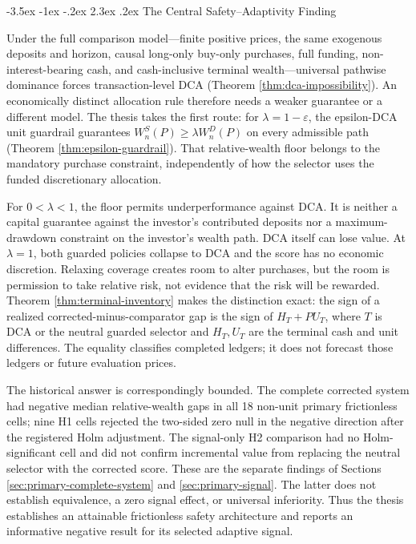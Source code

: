 \documentclass[12pt,a4paper,oneside]{report}
\makeatletter
\renewcommand\section{\@startsection{section}{1}{\z@}%
  {-3.5ex \@plus -1ex \@minus -.2ex}%
  {2.3ex \@plus .2ex}%
  {\normalfont\fontsize{14}{17}\selectfont\bfseries}}
\makeatother
\begin{document}
\section{The Central Safety--Adaptivity Finding}
\label{sec:central-finding}

Under the full comparison model---finite positive prices, the same exogenous
deposits and horizon, causal long-only buy-only purchases, full funding,
non-interest-bearing cash, and cash-inclusive terminal wealth---universal
pathwise dominance forces transaction-level DCA (Theorem
\ref{thm:dca-impossibility}). An economically distinct allocation rule therefore
needs a weaker guarantee or a different model. The thesis takes the first
route: for $\lambda=1-\varepsilon$, the epsilon-DCA unit guardrail guarantees
$W_n^S(P)\geq\lambda W_n^D(P)$ on every admissible path (Theorem
\ref{thm:epsilon-guardrail}). That relative-wealth floor belongs to the
mandatory purchase constraint, independently of how the selector uses the
funded discretionary allocation.

For $0<\lambda<1$, the floor permits underperformance against DCA. It is
neither a capital guarantee against the investor's contributed deposits nor a
maximum-drawdown constraint on the investor's wealth path. DCA itself can lose
value. At $\lambda=1$, both guarded policies collapse to DCA and the score has
no economic discretion. Relaxing coverage creates room to alter purchases,
but the room is permission to take relative risk, not evidence that the risk
will be rewarded. Theorem \ref{thm:terminal-inventory} makes the distinction
exact: the sign of a realized corrected-minus-comparator gap is the sign of
$H_T+P U_T$, where $T$ is DCA or the neutral guarded selector and $H_T,U_T$
are the terminal cash and unit differences. The equality classifies completed
ledgers; it does not forecast those ledgers or future evaluation prices.

The historical answer is correspondingly bounded. The complete corrected
system had negative median relative-wealth gaps in all 18 non-unit primary
frictionless cells; nine H1 cells rejected the two-sided zero null in the
negative direction after the registered Holm adjustment. The signal-only H2
comparison had no Holm-significant cell and did not confirm incremental value
from replacing the neutral selector with the corrected score. These are the
separate findings of Sections \ref{sec:primary-complete-system} and
\ref{sec:primary-signal}. The latter does not establish equivalence, a zero
signal effect, or universal inferiority. Thus the thesis establishes an
attainable frictionless safety architecture and reports an informative
negative result for its selected adaptive signal.
\end{document}
